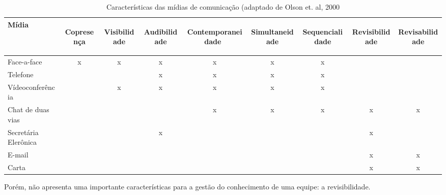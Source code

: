 \begin{table}[]
\centering
\caption{Características das mídias de comunicação (adaptado de Olson et. al, 2000}
\label{my-label}
\begin{tabular}{|l|c|c|c|c|c|c|c|c|}
\hline
Mídia                & \begin{turn}{90}Copresença\end{turn} &\begin{turn}{90} Visibilidade\end{turn} & \begin{turn}{90}Audibilidade\end{turn} & \begin{turn}{90}Contemporaneidade \, \end{turn} & \begin{turn}{90}Simultaneidade\end{turn} & \begin{turn}{90}Sequencialidade\end{turn} &\begin{turn}{90}Revisibilidade\end{turn} & \begin{turn}{90}Revisabilidade\end{turn} \\ \hline
Face-a-face          &   x     &      x        &    x          &          x        &        x        &         x    &                &                \\ \hline
Telefone             &           &       &     x         &           x        &         x       &         x        &                &                \\ \hline
Vídeoconferência     &        &       x   &          x    &       x            &         x       &       x          &                &                \\ \hline
Chat de duas vias    &                                 &                                   &              &           x        &          x      &        x         &        x        &          x      \\ \hline
Secretária Elerônica &                                 &                                   &     x         &                   &                &                 &        x        &                \\ \hline
E-mail               &                                 &                                   &              &                   &                &                 &      x          &     x           \\ \hline
Carta                &                                 &                                   &              &                   &                &                 &       x         &       x         \\ \hline
\end{tabular}
\end{table}
Porém, não apresenta uma importante características para a gestão do conhecimento de uma equipe: a revisibilidade.

